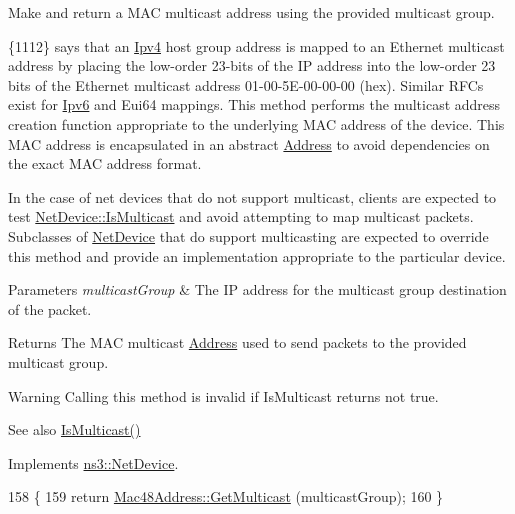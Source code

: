 Make and return a M\+AC multicast address using the provided multicast group. 

\{1112\} says that an \hyperlink{classns3_1_1Ipv4}{Ipv4} host group address is mapped to an Ethernet multicast address by placing the low-\/order 23-\/bits of the IP address into the low-\/order 23 bits of the Ethernet multicast address 01-\/00-\/5\+E-\/00-\/00-\/00 (hex). Similar R\+F\+Cs exist for \hyperlink{classns3_1_1Ipv6}{Ipv6} and Eui64 mappings. This method performs the multicast address creation function appropriate to the underlying M\+AC address of the device. This M\+AC address is encapsulated in an abstract \hyperlink{classns3_1_1Address}{Address} to avoid dependencies on the exact M\+AC address format.

In the case of net devices that do not support multicast, clients are expected to test \hyperlink{classns3_1_1NetDevice_a1afb4848a9226540f1ff51f9b31ae95e}{Net\+Device\+::\+Is\+Multicast} and avoid attempting to map multicast packets. Subclasses of \hyperlink{classns3_1_1NetDevice}{Net\+Device} that do support multicasting are expected to override this method and provide an implementation appropriate to the particular device.


\begin{DoxyParams}{Parameters}
{\em multicast\+Group} & The IP address for the multicast group destination of the packet. \\
\hline
\end{DoxyParams}
\begin{DoxyReturn}{Returns}
The M\+AC multicast \hyperlink{classns3_1_1Address}{Address} used to send packets to the provided multicast group.
\end{DoxyReturn}
\begin{DoxyWarning}{Warning}
Calling this method is invalid if Is\+Multicast returns not true. 
\end{DoxyWarning}
\begin{DoxySeeAlso}{See also}
\hyperlink{classns3_1_1LoopbackNetDevice_a889c040c2e85a29fdebb00ebba1854ed}{Is\+Multicast()} 
\end{DoxySeeAlso}


Implements \hyperlink{classns3_1_1NetDevice_a98aa4852df367b6a393c8cc1d88af0d9}{ns3\+::\+Net\+Device}.


\begin{DoxyCode}
158 \{
159   \textcolor{keywordflow}{return} \hyperlink{classns3_1_1Mac48Address_a23d170f8c7a7d90a8110425620285819}{Mac48Address::GetMulticast} (multicastGroup);
160 \}
\end{DoxyCode}


